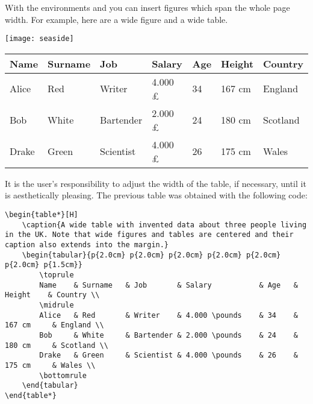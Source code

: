 With the environments  and  you 
can insert figures which span the whole page width. For example, here 
are a wide figure and a wide table.

\begin{figure*}[H]
	\texttt{[image: seaside]}
	\caption[A wide seaside]{A wide seaside, and a wide caption.
		Credits: By Bushra Feroz, CC BY-SA 4.0, \url{https://commons.wikimedia.org/w/index.php?curid=68724647}}
\end{figure*}

\begin{table*}[H]
    \caption{A wide table with invented data about three people living in the UK. Note that wide figures and tables are centered and their caption also extends into the margin.}
    \begin{tabular}{p{2.0cm} p{2.0cm} p{2.0cm} p{2.0cm} p{2.0cm} p{2.0cm} p{1.5cm}}
        \toprule
        Name    & Surname   & Job       & Salary           & Age   & Height    & Country \\
        \midrule
        Alice   & Red       & Writer    & 4.000 \pounds    & 34    & 167 cm     & England \\
        Bob     & White     & Bartender & 2.000 \pounds    & 24    & 180 cm     & Scotland \\
        Drake   & Green     & Scientist & 4.000 \pounds    & 26    & 175 cm     & Wales \\
        \bottomrule
    \end{tabular}
\end{table*}

It is the user's responsibility to adjust the width of the table, if 
necessary, until it is aesthetically pleasing. The previous table was 
obtained with the following code:

\begin{lstlisting}[caption=How to typeset a wide table]
\begin{table*}[H]
    \caption{A wide table with invented data about three people living in the UK. Note that wide figures and tables are centered and their caption also extends into the margin.}
    \begin{tabular}{p{2.0cm} p{2.0cm} p{2.0cm} p{2.0cm} p{2.0cm} p{2.0cm} p{1.5cm}}
        \toprule
        Name    & Surname   & Job       & Salary           & Age   & Height    & Country \\
        \midrule
        Alice   & Red       & Writer    & 4.000 \pounds    & 34    & 167 cm     & England \\
        Bob     & White     & Bartender & 2.000 \pounds    & 24    & 180 cm     & Scotland \\
        Drake   & Green     & Scientist & 4.000 \pounds    & 26    & 175 cm     & Wales \\
        \bottomrule
    \end{tabular}
\end{table*}
\end{lstlisting}

